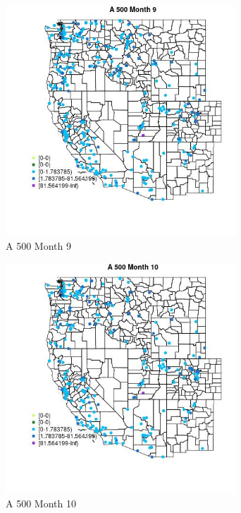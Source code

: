 \begin{figure} 
\centering  
\includegraphics[width=0.77\textwidth]{Code_Outputs/Report_ML_input_PM25_Step4_part_e_de_duplicated_aveswNAs_MapObsMo9A_500.jpg} 
\caption{\label{fig:Report_ML_input_PM25_Step4_part_e_de_duplicated_aveswNAsMapObsMo9A_500}A 500 Month 9} 
\end{figure} 
 

\begin{figure} 
\centering  
\includegraphics[width=0.77\textwidth]{Code_Outputs/Report_ML_input_PM25_Step4_part_e_de_duplicated_aveswNAs_MapObsMo10A_500.jpg} 
\caption{\label{fig:Report_ML_input_PM25_Step4_part_e_de_duplicated_aveswNAsMapObsMo10A_500}A 500 Month 10} 
\end{figure} 
 

